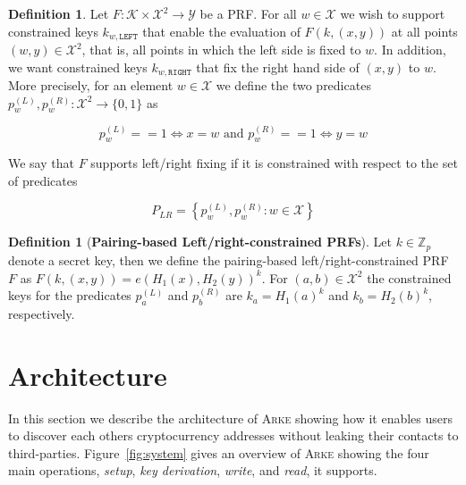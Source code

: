 \documentclass[11pt,letterpaper]{article}
\theoremstyle{definition}
\newtheorem{definition}[theorem]{Definition}
\newcommand{\philipp}[1]{\dtcolornote[Philipp]{orange}{#1}}
\newcommand{\ZZ}{\mathbb{Z}}
\newcommand{\sys}{\textsc{Arke}\xspace}
\begin{document}
\begin{definition}

  Let $F: \mathcal{K} \times \mathcal{X}^2 \rightarrow \mathcal{Y}$ be a PRF.
  For all $w \in \mathcal{X}$ we wish to support constrained keys $k_{w,
        \mathtt{LEFT}}$ that enable the evaluation of $F(k, (x,y))$ at all points $(w,
    y) \in \mathcal{X}^2$, that is, all points in which the left side is fixed to
  $w$. In addition, we want constrained keys $k_{w, \mathtt{RIGHT}}$ that fix
  the right hand side of $(x, y)$ to $w$. More precisely, for an element $w \in
    \mathcal{X}$ we define the two predicates $p_w^{(L)}, p_w^{(R)}: \mathcal{X}^2
    \rightarrow \{0, 1\}$ as

  \[ p_w^{(L)} == 1 \iff x = w \text{ and } p_w^{(R)} == 1 \iff y = w\]

  We say that $F$ supports left/right fixing if it is constrained with respect to
  the set of predicates

  $$P_{LR} = \left\{p_w^{(L)}, p_w^{(R)} : w \in \mathcal{X}\right\}$$

\end{definition}


\begin{definition}[\bf Pairing-based Left/right-constrained PRFs]

  Let $k \in \ZZ_p$ denote a secret key, then we define the pairing-based
  left/right-constrained PRF $F$ as $F(k, (x,y)) = e(H_1(x), H_2(y))^k$. For
  $(a, b)\in \mathcal{X}^2$ the constrained keys for the predicates
  $p_{a}^{(L)}$ and $p_{b}^{(R)}$ are $k_{a} = H_1(a)^k$ and $k_{b} = H_2(b)^k$,
  respectively.

\end{definition}



\section{Architecture}\label{sec:architecture}


In this section we describe the architecture of \sys  showing how it enables users to discover each others cryptocurrency addresses without leaking their contacts to third-parties. Figure~\ref{fig:system} gives an overview of \sys showing the four main operations, \emph{setup}, \emph{key derivation}, \emph{write}, and \emph{read}, it supports.
\end{document}
